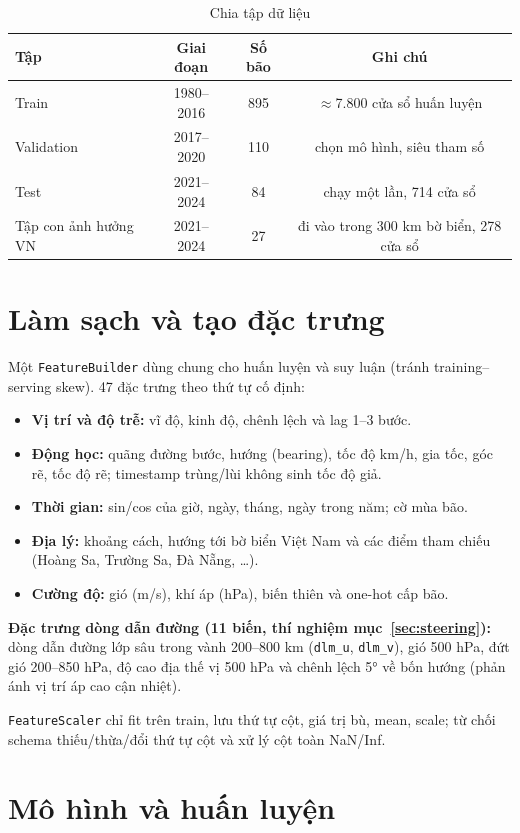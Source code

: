 \documentclass[12pt,a4paper]{article}
\begin{document}
\begin{table}[H]\centering
\begin{tabular}{lccc}
\toprule
Tập & Giai đoạn & Số bão & Ghi chú \\
\midrule
Train & 1980--2016 & 895 & $\approx$7.800 cửa sổ huấn luyện \\
Validation & 2017--2020 & 110 & chọn mô hình, siêu tham số \\
Test & 2021--2024 & 84 & chạy một lần, 714 cửa sổ \\
Tập con ảnh hưởng VN & 2021--2024 & 27 & đi vào trong 300 km bờ biển, 278 cửa sổ \\
\bottomrule
\end{tabular}
\caption{Chia tập dữ liệu}
\end{table}

\section{Làm sạch và tạo đặc trưng}
Một \texttt{FeatureBuilder} dùng chung cho huấn luyện và suy luận (tránh
training--serving skew). 47 đặc trưng theo thứ tự cố định:
\begin{itemize}
  \item \textbf{Vị trí và độ trễ:} vĩ độ, kinh độ, chênh lệch và lag 1--3 bước.
  \item \textbf{Động học:} quãng đường bước, hướng (bearing), tốc độ km/h, gia tốc,
        góc rẽ, tốc độ rẽ; timestamp trùng/lùi không sinh tốc độ giả.
  \item \textbf{Thời gian:} sin/cos của giờ, ngày, tháng, ngày trong năm; cờ mùa bão.
  \item \textbf{Địa lý:} khoảng cách, hướng tới bờ biển Việt Nam và các điểm tham
        chiếu (Hoàng Sa, Trường Sa, Đà Nẵng, \dots).
  \item \textbf{Cường độ:} gió (m/s), khí áp (hPa), biến thiên và one-hot cấp bão.
\end{itemize}
\textbf{Đặc trưng dòng dẫn đường (11 biến, thí nghiệm mục~\ref{sec:steering}):}
dòng dẫn đường lớp sâu trong vành 200--800 km (\texttt{dlm\_u}, \texttt{dlm\_v}),
gió 500 hPa, đứt gió 200--850 hPa, độ cao địa thế vị 500 hPa và chênh lệch 5° về
bốn hướng (phản ánh vị trí áp cao cận nhiệt).

\texttt{FeatureScaler} chỉ fit trên train, lưu thứ tự cột, giá trị bù, mean, scale;
từ chối schema thiếu/thừa/đổi thứ tự cột và xử lý cột toàn NaN/Inf.

\section{Mô hình và huấn luyện}
\end{document}
